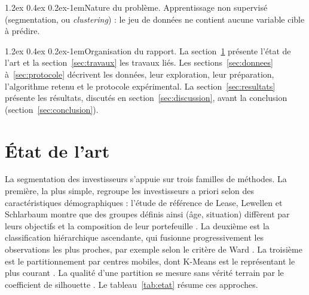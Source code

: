 \documentclass[11pt,a4paper]{article}
\makeatletter
\renewcommand\paragraph{\@startsection{paragraph}{4}{\z@}%
  {1.2ex \@plus 0.4ex \@minus 0.2ex}{-1em}{\normalfont\normalsize\bfseries}}
\makeatother
\begin{document}
\paragraph{Nature du problème.} Apprentissage non supervisé (segmentation, ou \emph{clustering}) : le jeu de données ne contient aucune variable cible à prédire.

\paragraph{Organisation du rapport.} La section~\ref{sec:etat} présente l'état de l'art et la section~\ref{sec:travaux} les travaux liés. Les sections~\ref{sec:donnees} à~\ref{sec:protocole} décrivent les données, leur exploration, leur préparation, l'algorithme retenu et le protocole expérimental. La section~\ref{sec:resultats} présente les résultats, discutés en section~\ref{sec:discussion}, avant la conclusion (section~\ref{sec:conclusion}).

\section{État de l'art}
\label{sec:etat}
La segmentation des investisseurs s'appuie sur trois familles de méthodes. La première, la plus simple, regroupe les investisseurs a priori selon des caractéristiques démographiques : l'étude de référence de Lease, Lewellen et Schlarbaum montre que des groupes définis ainsi (âge, situation) diffèrent par leurs objectifs et la composition de leur portefeuille \cite{etat1}. La deuxième est la classification hiérarchique ascendante, qui fusionne progressivement les observations les plus proches, par exemple selon le critère de Ward \cite{ward1963}. La troisième est le partitionnement par centres mobiles, dont K-Means est le représentant le plus courant \cite{macqueen1967,lloyd1982,jain2010}. La qualité d'une partition se mesure sans vérité terrain par le coefficient de silhouette \cite{rousseeuw1987}. Le tableau~\ref{tab:etat} résume ces approches.
\end{document}
